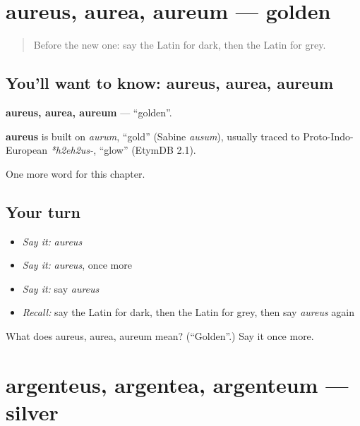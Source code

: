 \section[aureus, aurea, aureum]{aureus, aurea, aureum — golden}

\label{lesson:LA-C149-aureus}



\begin{quote}
Before the new one: say the Latin for dark, then the Latin for grey.
\end{quote}

\subsection*{You'll want to know: aureus, aurea, aureum}
\textbf{aureus, aurea, aureum} — \textquotedblleft{}golden\textquotedblright{}.

\begin{cousinweb}
\textbf{aureus} is built on \emph{aurum}, \textquotedblleft{}gold\textquotedblright{} (Sabine \emph{ausum}), usually traced to Proto-Indo-European \emph{*h2eh2us-}, \textquotedblleft{}glow\textquotedblright{} (EtymDB 2.1).
\end{cousinweb}

\begin{grammarlens}[title={What you've built}]
One more word for this chapter.
\end{grammarlens}

\subsection*{Your turn}
\begin{itemize}
\raggedright
  \item \emph{Say it:} \emph{aureus}
  \item \emph{Say it:} \emph{aureus}, once more
  \item \emph{Say it:} say \emph{aureus}
  \item \emph{Recall:} say the Latin for dark, then the Latin for grey, then say \emph{aureus} again
\end{itemize}

\begin{tcolorbox}[breakable,colback=teal!4,colframe=teal!35!black,title={Before you move on}]
What does aureus, aurea, aureum mean? (\textquotedblleft{}Golden\textquotedblright{}.) Say it once more.
\end{tcolorbox}
\section[argenteus, argentea, argenteum]{argenteus, argentea, argenteum — silver}

